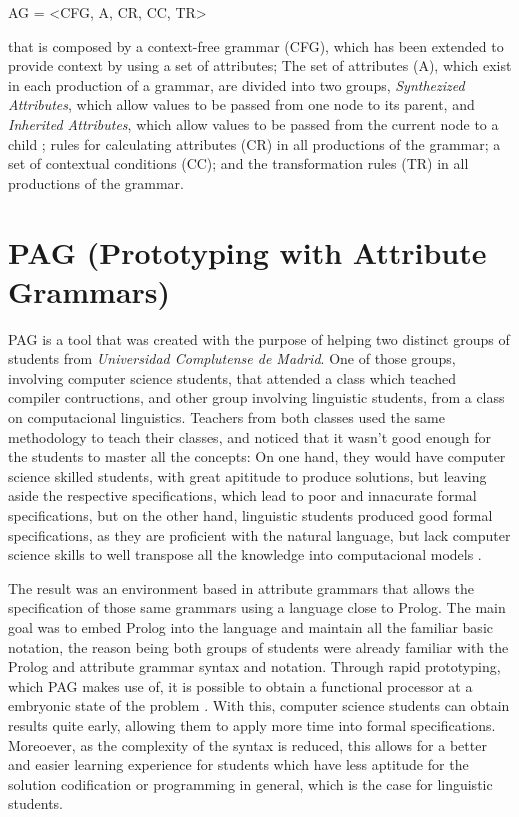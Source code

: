 AG = \textless CFG, A, CR, CC, TR\textgreater

\noindent that is composed by a context-free grammar (CFG), which has been extended to provide context by using a set of attributes; 
The set of attributes (A), which exist in each production of a grammar, are divided into two groups, \emph{Synthezized Attributes}, which allow values to be passed from one node to its parent, 
and \emph{Inherited Attributes}, which allow values to be passed from the current node to a child \cite{slonneger_1995}; 
rules for calculating attributes (CR) in all productions of the grammar; 
a set of contextual conditions (CC); 
and the transformation rules (TR) in all productions of the grammar.


\section{PAG (Prototyping with Attribute Grammars)}
PAG is a tool that was created with the purpose of helping two distinct groups of students from \emph{Universidad Complutense de Madrid}. 
One of those groups, involving computer science students, that attended a class which teached compiler contructions, and other group involving linguistic students, from a class on computacional linguistics. 
Teachers from both classes used the same methodology to teach their classes, 
and noticed that it wasn't good enough for the students to master all the concepts: On one hand, they would have computer science skilled students, 
with great apititude to produce solutions, but leaving aside the respective specifications, which lead to poor and innacurate formal specifications, but on the other hand, 
linguistic students produced good formal specifications, as they are proficient with the natural language,
but lack computer science skills to well transpose all the knowledge into computacional models \cite{sierra_2006}.
	
The result was an environment based in attribute grammars that allows the specification of those same grammars using a language close to Prolog. 
The main goal was to embed Prolog into the language and maintain all the familiar basic notation, 
the reason being both groups of students were already familiar with the Prolog and attribute grammar syntax and notation. 
Through rapid prototyping, which PAG makes use of, it is possible to obtain a functional processor at a embryonic state of the problem \cite{sierra_2006}. 
With this, computer science students can obtain results quite early, allowing them to apply more time into formal specifications. 
Moreoever, as the complexity of the syntax is reduced, this allows for a better and easier learning experience for students which have less aptitude for the solution codification or programming in general, 
which is the case for linguistic students.

